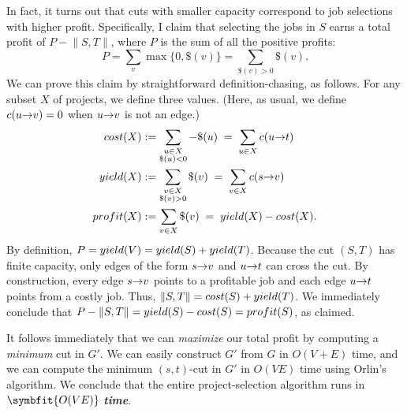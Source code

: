 In fact, it turns out that cuts with smaller capacity correspond to job selections with higher profit.
Specifically, I claim that selecting the jobs in $S$ earns a total profit of $P - \lVert S,T\rVert$, where $P$ is the sum of all the positive profits:
\[
P = \sum_v \max\{0, \$(v)\} = \sum_{\$(v)>0} \$(v).
\]
We can prove this claim by straightforward definition-chasing, as follows.
For any subset $X$ of projects, we define three values.
(Here, as usual, we define $c(u\mathord{\rightarrow}v) = 0$ when $u\mathord{\rightarrow}v$ is not an edge.)
\begin{align*}
cost(X) &:= \sum_{\substack{u \in X\\ \$(u)<0}} -\$(u) \;=\; \sum_{u \in X} c(u\mathord{\rightarrow}t)\\
yield(X) &:= \sum_{\substack{v \in X\\ \$(v)>0}} \$(v) \;=\; \sum_{v \in X} c(s\mathord{\rightarrow}v)\\
profit(X) &:= \sum_{v \in X} \$(v) \;=\; yield(X) - cost(X).
\end{align*}
By definition, $P = yield(V) = yield(S) + yield(T)$.
Because the cut $(S,T)$ has finite capacity, only edges of the form $s\mathord{\rightarrow}v$ and $u\mathord{\rightarrow}t$ can cross the cut.
By construction, every edge $s\mathord{\rightarrow}v$ points to a profitable job and each edge $u\mathord{\rightarrow}t$ points from a costly job.
Thus, $\lVert S,T\rVert = cost(S) + yield(T)$.
We immediately conclude that $P - \lVert S,T\rVert = yield(S) - cost(S) = profit(S)$, as claimed.

It follows immediately that we can \textit{maximize} our total profit by computing a \textit{minimum} cut in $G'$.
We can easily construct $G'$ from $G$ in $O(V + E)$ time, and we can compute the minimum $(s,t)$-cut in $G'$ in $O(VE)$ time using Orlin’s algorithm.
We conclude that the entire project-selection algorithm runs in $\symbfit{O(VE)}$ \textbf{\textit{time}}.

